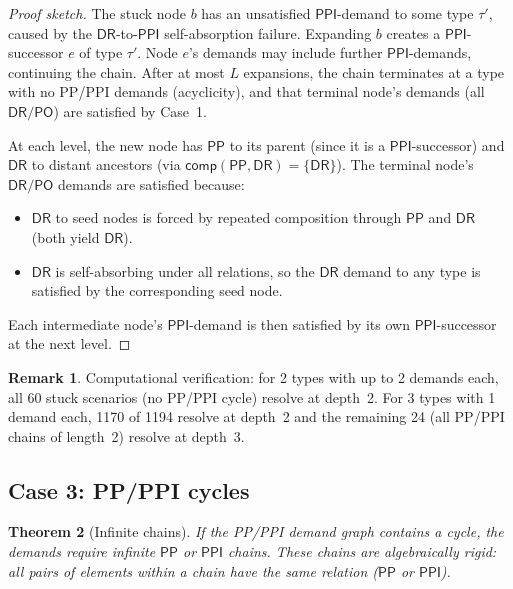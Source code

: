 \documentclass[a4paper,11pt]{article}
\newtheorem{theorem}{Theorem}[section]
\theoremstyle{definition}
\newtheorem{remark}[theorem]{Remark}
\newcommand{\DR}{\ensuremath{\mathsf{DR}}}
\newcommand{\PO}{\ensuremath{\mathsf{PO}}}
\newcommand{\PP}{\ensuremath{\mathsf{PP}}}
\newcommand{\PPI}{\ensuremath{\mathsf{PPI}}}
\newcommand{\comp}{\ensuremath{\mathsf{comp}}}
\begin{document}
\begin{proof}[Proof sketch]
The stuck node $b$ has an unsatisfied $\PPI$-demand to some type
$\tau'$, caused by the $\DR$-to-$\PPI$ self-absorption failure.
Expanding $b$ creates a $\PPI$-successor $e$ of type $\tau'$.
Node $e$'s demands may include further $\PPI$-demands, continuing
the chain.  After at most $L$ expansions, the chain terminates at
a type with no PP/PPI demands (acyclicity), and that terminal
node's demands (all $\DR/\PO$) are satisfied by Case~1.

At each level, the new node has $\PP$ to its parent (since it is
a $\PPI$-successor) and $\DR$ to distant ancestors (via
$\comp(\PP, \DR) = \{\DR\}$).  The terminal node's $\DR/\PO$
demands are satisfied because:
\begin{itemize}[nosep]
  \item $\DR$ to seed nodes is forced by repeated composition
    through $\PP$ and $\DR$ (both yield $\DR$).
  \item $\DR$ is self-absorbing under all relations, so the $\DR$
    demand to any type is satisfied by the corresponding seed node.
\end{itemize}
Each intermediate node's $\PPI$-demand is then satisfied by its
own $\PPI$-successor at the next level.
\end{proof}

\begin{remark}
Computational verification: for 2 types with up to 2 demands each,
all 60 stuck scenarios (no PP/PPI cycle) resolve at depth~2.  For
3 types with 1 demand each, 1170 of 1194 resolve at depth~2 and
the remaining 24 (all PP/PPI chains of length~2) resolve at
depth~3.
\end{remark}

\subsection{Case 3: PP/PPI cycles}

\begin{theorem}[Infinite chains]
\label{thm:case3}
If the PP/PPI demand graph contains a cycle, the demands require
infinite $\PP$ or $\PPI$ chains.  These chains are algebraically
rigid: all pairs of elements within a chain have the same relation
\textup{(}$\PP$ or $\PPI$\textup{)}.
\end{theorem}
\end{document}
